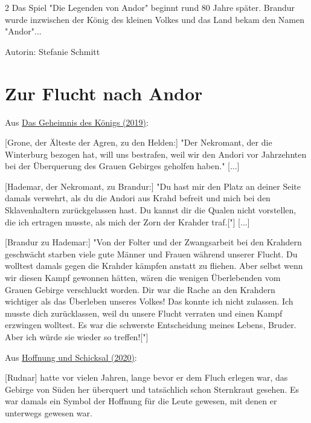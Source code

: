 \documentclass[10pt, a4paper, oneside]{book}
\newcommand{\fillbreak}{\vspace*{\fill}\columnbreak}
\begin{document}
\begin{multicols}{2}
Das Spiel "Die Legenden von Andor" beginnt rund 80 Jahre später. Brandur wurde inzwischen der König des kleinen Volkes und das Land bekam den Namen "Andor"...\bigskip

Autorin: Stefanie Schmitt



\fillbreak
\section{Zur Flucht nach Andor}


\begin{center}
    Aus \hyperref[produkt-2019-das-geheimnis-des-koenigs]{Das Geheimnis des Königs (2019)}:
\end{center}

[Grone, der Älteste der Agren, zu den Helden:] "Der Nekromant, der die Winterburg bezogen hat, will uns bestrafen, weil wir den Andori vor Jahrzehnten bei der Überquerung des Grauen Gebirges geholfen haben." [...]

[Hademar, der Nekromant, zu Brandur:] "Du hast mir den Platz an deiner Seite damals verwehrt, als du die Andori aus Krahd befreit und mich bei den Sklavenhaltern zurückgelassen hast. Du kannst dir die Qualen nicht vorstellen, die ich ertragen musste, als mich der Zorn der Krahder traf.["] [...]

[Brandur zu Hademar:] "Von der Folter und der Zwangsarbeit bei den Krahdern geschwächt starben viele gute Männer und Frauen während unserer Flucht. Du wolltest damals gegen die Krahder kämpfen anstatt zu fliehen. Aber selbst wenn wir diesen Kampf gewonnen hätten, wären die wenigen Überlebenden vom Grauen Gebirge verschluckt worden. Dir war die Rache an den Krahdern wichtiger als das Überleben unseres Volkes! Das konnte ich nicht zulassen. Ich musste dich zurücklassen, weil du unsere Flucht verraten und einen Kampf erzwingen wolltest. Es war die schwerste Entscheidung meines Lebens, Bruder. Aber ich würde sie wieder so treffen!["]


\begin{center}
    Aus \hyperref[storytext-2020-hoffnung-und-schicksal]{Hoffnung und Schicksal (2020)}:
\end{center}

[Rudnar] hatte vor vielen Jahren, lange bevor er dem Fluch erlegen war, das Gebirge von Süden her überquert und tatsächlich schon Sternkraut gesehen. Es war damals ein Symbol der Hoffnung für die Leute gewesen, mit denen er unterwegs gewesen war.



\end{multicols}
\end{document}
